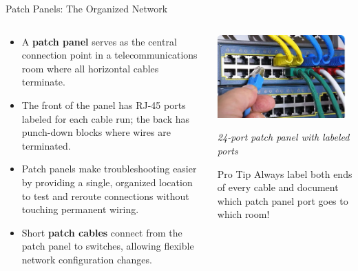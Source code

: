 \documentclass[aspectratio=169]{beamer}
\begin{document}
\begin{frame}{Patch Panels: The Organized Network}
    \begin{columns}[T]
        \begin{column}{0.5\textwidth}
            \begin{itemize}
                \item A \textbf{patch panel} serves as the central connection point in a telecommunications room where all horizontal cables terminate.
                \item The front of the panel has RJ-45 ports labeled for each cable run; the back has punch-down blocks where wires are terminated.
                \item Patch panels make troubleshooting easier by providing a single, organized location to test and reroute connections without touching permanent wiring.
                \item Short \textbf{patch cables} connect from the patch panel to switches, allowing flexible network configuration changes.
            \end{itemize}
        \end{column}
        \begin{column}{0.45\textwidth}
            \centering
            \includegraphics[width=0.95\textwidth]{patch_panel.png}
            
            \vspace{0.3cm}
            \small{\textit{24-port patch panel with labeled ports}}
            
            \vspace{0.2cm}
            \begin{alertblock}{Pro Tip}
                Always label both ends of every cable and document which patch panel port goes to which room!
            \end{alertblock}
        \end{column}
    \end{columns}
\end{frame}
\end{document}

